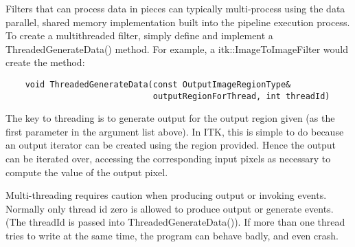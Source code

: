 Filters that can process data in pieces can typically multi-process using the
data parallel, shared memory implementation built into the pipeline execution
process. To create a multithreaded filter, simply define and implement a
ThreadedGenerateData() method. For example, a itk::ImageToImageFilter would create the method:

\begin{verbatim}
    void ThreadedGenerateData(const OutputImageRegionType& 
                              outputRegionForThread, int threadId)
\end{verbatim}

The key to threading is to generate output for the output region given (as
the first parameter in the argument list above). In ITK, this is simple to do
because an output iterator can be created using the region provided. Hence
the output can be iterated over, accessing the corresponding input pixels as
necessary to compute the value of the output pixel.

Multi-threading requires caution when producing output or invoking
events. Normally only thread id zero is allowed to produce output or generate
events. (The threadId is passed into ThreadedGenerateData()). If more than
one thread tries to write at the same time, the program can behave badly, and
even crash.

